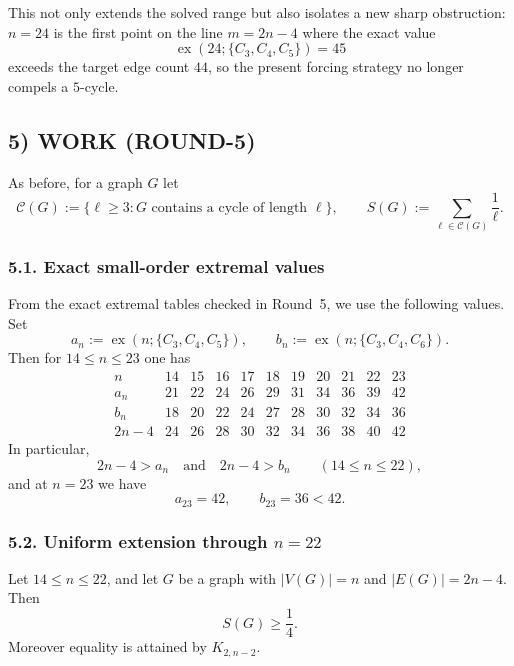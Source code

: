 This not only extends the solved range but also isolates a new sharp obstruction: $n=24$ is the first point on the line $m=2n-4$ where the exact value
\[
\operatorname{ex}(24;\{C_3,C_4,C_5\})=45
\]
exceeds the target edge count $44$, so the present forcing strategy no longer compels a $5$-cycle.

\subsection*{5) WORK (ROUND-5)}

As before, for a graph $G$ let
\[
\mathcal C(G):=\{\ell\ge 3:\text{$G$ contains a cycle of length $\ell$}\},
\qquad
S(G):=\sum_{\ell\in\mathcal C(G)}\frac1\ell.
\]

\subsubsection*{5.1. Exact small-order extremal values}

From the exact extremal tables checked in Round~5, we use the following values.
Set
\[
a_n:=\operatorname{ex}(n;\{C_3,C_4,C_5\}),
\qquad
b_n:=\operatorname{ex}(n;\{C_3,C_4,C_6\}).
\]
Then for $14\le n\le 23$ one has
\[
\begin{array}{c|cccccccccc}
 n & 14&15&16&17&18&19&20&21&22&23\\\hline
 a_n & 21&22&24&26&29&31&34&36&39&42\\
 b_n & 18&20&22&24&27&28&30&32&34&36\\
 2n-4 & 24&26&28&30&32&34&36&38&40&42
\end{array}
\]
In particular,
\begin{equation}\label{eq:strict14to22}
2n-4>a_n\quad\text{and}\quad 2n-4>b_n\qquad(14\le n\le 22),
\end{equation}
and at $n=23$ we have
\begin{equation}\label{eq:n23exact}
a_{23}=42,
\qquad
b_{23}=36<42.
\end{equation}

\subsubsection*{5.2. Uniform extension through $n=22$}

\begin{proposition}[The line $m=2n-4$ for $14\le n\le 22$]\label{prop:14-22}
Let $14\le n\le 22$, and let $G$ be a graph with $|V(G)|=n$ and $|E(G)|=2n-4$.
Then
\[
S(G)\ge \frac14.
\]
Moreover equality is attained by $K_{2,n-2}$.
\end{proposition}

